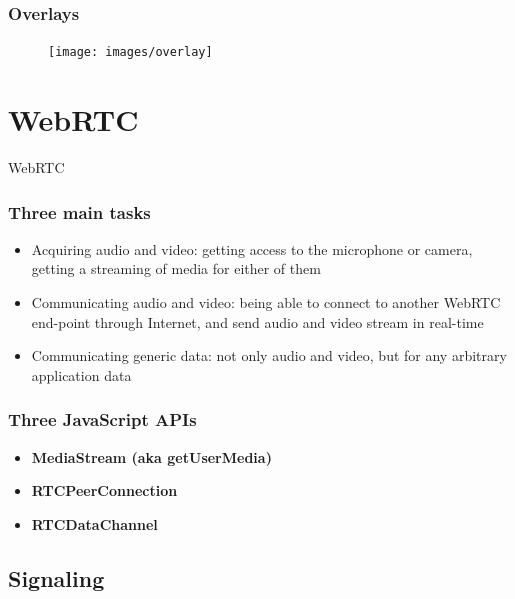 \documentclass{beamer}
\begin{document}
\begin{frame}
\frametitle{Overlays}

\begin{figure}
\texttt{[image: images/overlay]}
\end{figure}

\end{frame}

\section{WebRTC}

\begin{frame}[c]
\Huge{\centerline{WebRTC}}

\end{frame}


\begin{frame}\frametitle{Three main tasks}
\begin{itemize}
  \item Acquiring audio and video: getting access to the microphone or camera, getting a streaming of media for either of them
  \item Communicating audio and video: being able to connect to another WebRTC end-point through Internet, and send audio and video stream in real-time
  \item Communicating generic data: not only audio and video, but for any arbitrary application data
\end{itemize}    
\end{frame}

\begin{frame}\frametitle{Three JavaScript APIs}

\begin{itemize}
  \item\textbf{\textsf{MediaStream} (aka getUserMedia)}
  \item\textbf{\textsf{RTCPeerConnection}}
  \item\textbf{\textsf{RTCDataChannel}}
\end{itemize}
\end{frame}

\subsection{Signaling}
\end{document}
